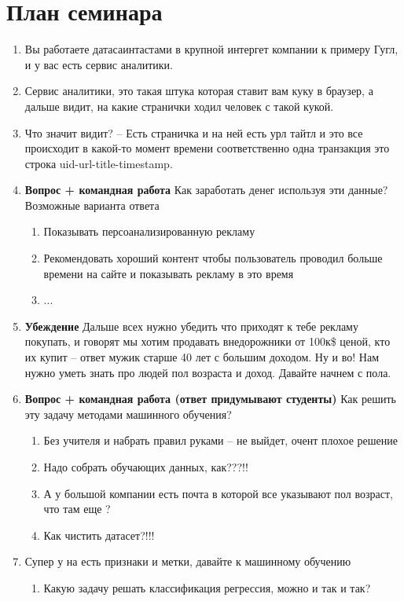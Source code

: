 \documentclass[a4paper, 12pt]{article}
\begin{document}
\section*{План семинара}
\begin{enumerate}
\item Вы работаете датасаинтастами в крупной интергет компании к примеру Гугл, и у вас есть сервис аналитики. 
\item  Сервис аналитики, это такая штука которая ставит вам куку в браузер, а дальше видит, на какие странички ходил человек с такой кукой.
\item  Что значит видит?  -- Есть страничка и на ней есть урл тайтл и это все происходит в какой-то момент времени соответственно одна транзакция это строка uid-url-title-timestamp.
\item \textbf{Вопрос + командная работа} Как заработать денег используя эти данные?
Возможные варианта ответа 
\begin{enumerate}
	\item Показывать персоанализированную рекламу
	\item Рекомендовать хороший контент чтобы пользователь проводил больше времени на сайте и показывать рекламу в это время
	\item ...
\end{enumerate}
\item \textbf{Убеждение} Дальше всех нужно убедить что приходят к тебе рекламу покупать, и говорят мы хотим продавать внедорожники от 100к\$ ценой, кто их купит -- ответ мужик старше 40 лет с большим доходом. Ну и во! Нам нужно уметь знать про людей пол возраста и доход. Давайте начнем с пола.
\item  \textbf{Вопрос + командная работа (ответ придумывают студенты)} Как решить эту задачу методами машинного обучения?
\begin{enumerate}
	\item Без учителя и набрать правил руками -- не выйдет, очент плохое решение
	\item Надо собрать обучающих данных, как???!!
	\item А у большой компании есть почта в которой все указывают пол возраст, что там еще ?
	\item Как чистить датасет?!!!
\end{enumerate}
\item Супер у на есть признаки и метки, давайте к машинному обучению
\begin{enumerate}
	\item Какую задачу решать классификация регрессия, можно и так и так?

\end{enumerate}
\end{enumerate}
\end{document}
